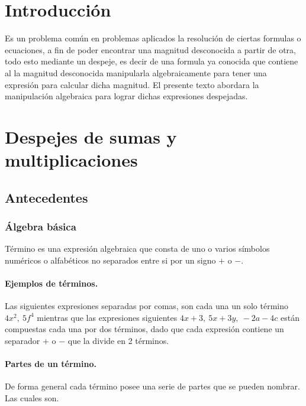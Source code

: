 \documentclass[11pt,letterpaper]{article}
\begin{document}
	\section{Introducción}
	
	Es un problema común en problemas aplicados la resolución de ciertas formulas o  ecuaciones, a fin de poder encontrar una magnitud desconocida a partir de otra, todo esto mediante un despeje, es decir de una formula ya conocida que contiene al la magnitud desconocida manipularla algebraicamente para tener una expresión para calcular dicha magnitud. El presente texto abordara la manipulación algebraica para lograr dichas expresiones despejadas.
	
	\section{Despejes de sumas y multiplicaciones}
	
	\subsection{Antecedentes}
	
	\subsubsection{Álgebra básica}
	
	\begin{definición}
		Término es una expresión algebraica que consta de uno o varios símbolos numéricos o alfabéticos no separados entre si por un signo $+$ o $-$.
	\end{definición}
	
	\paragraph{Ejemplos de términos.}
	
	Las siguientes expresiones separadas por comas, son cada una un solo término $4x^2, \ 5f^4$ mientras que las expresiones siguientes $4x+3, \ 5x+3y, \ -2a-4c$ están compuestas cada una por dos términos, dado que cada expresión contiene un separador $+$ o $-$ que la divide en 2 términos.
	
	\paragraph{Partes de un término.} De forma general cada término posee una serie de partes que se pueden nombrar. Las cuales son.
	
\end{document}
